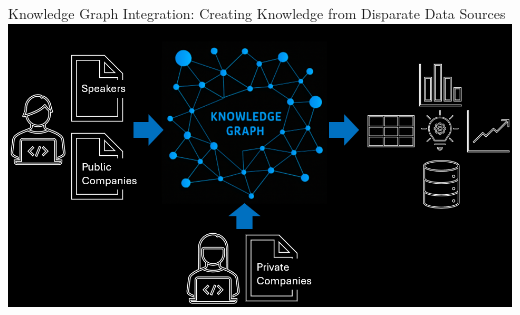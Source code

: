\documentclass[pdf,aspectratio=169]{beamer}
\begin{document}
\begin{frame}{Knowledge Graph Integration: Creating Knowledge from Disparate Data Sources}
  \centering
  \includegraphics[height=0.75\textheight]{data_fusion_knowledge_graph_2025-08-08.png}
\end{frame}
\end{document}
